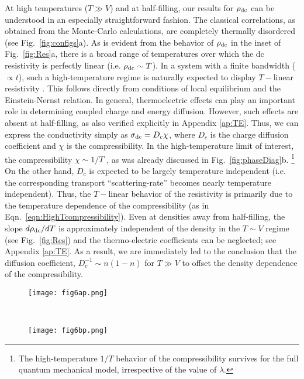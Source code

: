 \documentclass[aps,prx,onecolumn,amsmath,nofootinbib,amssymb,11pt]{revtex4-1}
\def \tn {\textnormal}
\def \rd {\rho_{\tn{dc}}}
\begin{document}
{At high temperatures ($T\gg V$) and at half-filling, our results for $\rd$ can be understood in an especially straightforward fashion. The classical correlations, as obtained from the Monte-Carlo calculations, are completely thermally disordered (see Fig.~\ref{fig:configs}a). As is evident from the behavior of $\rd$ in the inset of Fig.~\ref{fig:Res}a, there is a broad range of temperatures over which the dc resistivity is perfectly linear (i.e. $\rd\sim T$). In a system with a finite bandwidth ($\propto t$), such a high-temperature regime is naturally expected to display $T-$linear resistivity \cite{Oganesyan,HubbHighTGeorges}. This follows directly from conditions of local equilibrium and the Einstein-Nernst relation. In general, thermoelectric effects can play an important role in determining coupled charge and energy diffusion. However, such effects are absent at half-filling, as also verified explicitly in Appendix \ref{ap:TE}. Thus, we can express the conductivity simply as $\sigma_{\tn{dc}} =D_c  \chi$, where $D_c$ is the charge diffusion coefficient and $\chi$ is the compressibility. In the high-temperature limit of interest, the compressibility $\chi\sim 1/T$ , as was already discussed in Fig.~\ref{fig:phaseDiag}b. {\footnote{\textsf{The high-temperature $1/T$ behavior of the compressibility survives for the full quantum mechanical model, irrespective of the value of $\lambda$.}}} On the other hand, $D_c$ is expected to be largely temperature independent (i.e. the corresponding transport ``scattering-rate'' becomes nearly temperature independent). Thus, the $T-$linear behavior of the resistivity is primarily due to the temperature dependence of the compressibility (as in Eqn.~\ref{eqn:HighTcompressibility}). Even at densities away from half-filling, the slope $d\rd/dT$ is approximately independent of the density in the $T\sim V$ regime (see Fig.~\ref{fig:Res}) and the thermo-electric coefficients can be neglected; see Appendix \ref{ap:TE}. As a result, we are immediately led to the conclusion that the diffusion coefficient, $D_c^{-1}\sim n(1-n)$ for $T\gg V$ to offset the density dependence of the compressibility. 

\captionsetup[figure]{justification=centerlast}
\begin{figure*}[t!]
    \centering
    \begin{subfigure}[t]{0.5\textwidth}
        \centering
        \texttt{[image: fig6ap.png]}
    \end{subfigure}%
    ~ 
    \begin{subfigure}[t]{0.5\textwidth}
        \centering
        \texttt{[image: fig6bp.png]}
    \end{subfigure}
    \caption{\textsf{a) The central peak of the optical conductivity for fixed $V^{\prime}=0.01V$, $t=0.1 V^{\prime}$ and $n=1/2$ as a function of decreasing temperature. The dc resistivity is extracted from the peak-height, which is strongly temperature dependent; see inset. The peak-width is mildly temperature dependent. b) The dc resistivity as a function of temperature for a few representative fillings. The low-temperature behavior depends sensitively on the degree of commensuration. }}
    \label{fig:Res} 
\end{figure*} 


}
\end{document}
